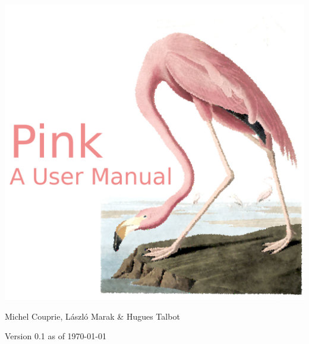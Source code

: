 
\thispagestyle{empty}

\begin{center}
\includegraphics[width=\textwidth]{images/Pink_a_User_Manual.png}
\end{center}

\vspace{1cm}
\centerline{\LARGE {\sf Michel Couprie, László Marak \& Hugues Talbot}}
\vspace{2cm}
\centerline{Version 0.1 as of \today}
\vspace{1cm}

\vspace{1mm}


\newpage
